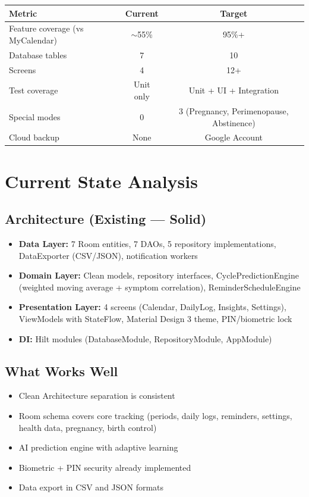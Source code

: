 \documentclass[12pt,a4paper]{article}
\begin{document}
\begin{tcolorbox}[colback=codebg, colframe=gray!50, title=\textbf{Key Metrics}]
\begin{tabularx}{\textwidth}{Xcc}
\toprule
\textbf{Metric} & \textbf{Current} & \textbf{Target} \\
\midrule
Feature coverage (vs MyCalendar) & $\sim$55\% & 95\%+ \\
Database tables & 7 & 10 \\
Screens & 4 & 12+ \\
Test coverage & Unit only & Unit + UI + Integration \\
Special modes & 0 & 3 (Pregnancy, Perimenopause, Abstinence) \\
Cloud backup & None & Google Account \\
\bottomrule
\end{tabularx}
\end{tcolorbox}

\section{Current State Analysis}

\subsection{Architecture (Existing — Solid)}
\begin{itemize}[leftmargin=1.5em]
  \item \textbf{Data Layer:} 7 Room entities, 7 DAOs, 5 repository implementations, DataExporter (CSV/JSON), notification workers
  \item \textbf{Domain Layer:} Clean models, repository interfaces, CyclePredictionEngine (weighted moving average + symptom correlation), ReminderScheduleEngine
  \item \textbf{Presentation Layer:} 4 screens (Calendar, DailyLog, Insights, Settings), ViewModels with StateFlow, Material Design 3 theme, PIN/biometric lock
  \item \textbf{DI:} Hilt modules (DatabaseModule, RepositoryModule, AppModule)
\end{itemize}

\subsection{What Works Well}
\begin{itemize}[leftmargin=1.5em]
  \item Clean Architecture separation is consistent
  \item Room schema covers core tracking (periods, daily logs, reminders, settings, health data, pregnancy, birth control)
  \item AI prediction engine with adaptive learning
  \item Biometric + PIN security already implemented
  \item Data export in CSV and JSON formats
\end{itemize}
\end{document}
